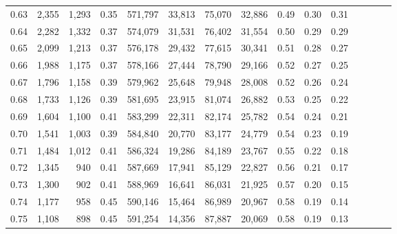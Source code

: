 \begin{tabular}{rrrcrrrrrrrrrrr}
0.63 &   2,355 &  1,293 &                                       0.35 &  571,797 &   33,813 &   75,070 &   32,886 &  0.49 &  0.30 &                         0.31 \\
0.64 &   2,282 &  1,332 &                                       0.37 &  574,079 &   31,531 &   76,402 &   31,554 &  0.50 &  0.29 &                         0.29 \\
0.65 &   2,099 &  1,213 &                                       0.37 &  576,178 &   29,432 &   77,615 &   30,341 &  0.51 &  0.28 &                         0.27 \\
0.66 &   1,988 &  1,175 &                                       0.37 &  578,166 &   27,444 &   78,790 &   29,166 &  0.52 &  0.27 &                         0.25 \\
0.67 &   1,796 &  1,158 &                                       0.39 &  579,962 &   25,648 &   79,948 &   28,008 &  0.52 &  0.26 &                         0.24 \\
0.68 &   1,733 &  1,126 &                                       0.39 &  581,695 &   23,915 &   81,074 &   26,882 &  0.53 &  0.25 &                         0.22 \\
0.69 &   1,604 &  1,100 &                                       0.41 &  583,299 &   22,311 &   82,174 &   25,782 &  0.54 &  0.24 &                         0.21 \\
0.70 &   1,541 &  1,003 &                                       0.39 &  584,840 &   20,770 &   83,177 &   24,779 &  0.54 &  0.23 &                         0.19 \\
0.71 &   1,484 &  1,012 &                                       0.41 &  586,324 &   19,286 &   84,189 &   23,767 &  0.55 &  0.22 &                         0.18 \\
0.72 &   1,345 &    940 &                                       0.41 &  587,669 &   17,941 &   85,129 &   22,827 &  0.56 &  0.21 &                         0.17 \\
0.73 &   1,300 &    902 &                                       0.41 &  588,969 &   16,641 &   86,031 &   21,925 &  0.57 &  0.20 &                         0.15 \\
0.74 &   1,177 &    958 &                                       0.45 &  590,146 &   15,464 &   86,989 &   20,967 &  0.58 &  0.19 &                         0.14 \\
0.75 &   1,108 &    898 &                                       0.45 &  591,254 &   14,356 &   87,887 &   20,069 &  0.58 &  0.19 &                         0.13 \\

\end{tabular}
